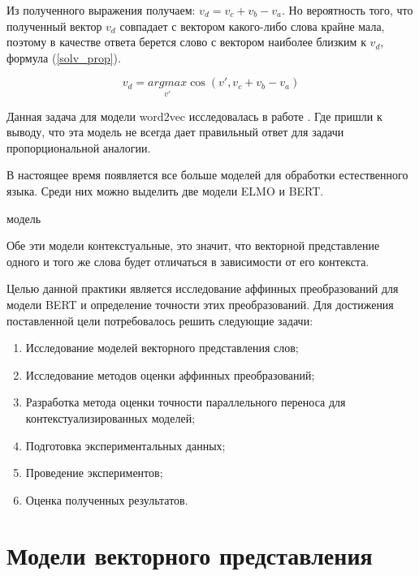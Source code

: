 \documentclass[a4paper,14pt]{article}
\begin{document}
Из полученного выражения получаем: $v_d = v_c + v_b - v_a$.
Но вероятность того, что полученный вектор $v_d$ совпадает с вектором какого-либо слова крайне мала, поэтому в качестве ответа берется слово с вектором наиболее близким к $v_d$, формула (\ref{solv_prop}).

\begin{equation}
	v_d = \underset{v'}{argmax} \cos (v', v_c + v_b - v_a)
	\label{solv_prop}
\end{equation}

Данная задача для модели word2vec исследовалась в работе . Где пришли к выводу, что эта модель не всегда дает правильный ответ для задачи пропорциональной аналогии.

В настоящее время появляется все больше моделей для обработки естественного языка. Среди них можно выделить две модели ELMO и BERT.

модель 

Обе эти модели контекстуальные, это значит, что векторной представление одного и того же слова будет отличаться в зависимости от его контекста.




Целью данной практики является исследование аффинных преобразований для модели BERT и определение точности этих преобразований.
Для достижения поставленной цели потребовалось решить следующие задачи:

\begin{enumerate}
	
\item Исследование моделей векторного представления слов;
 
\item Исследование методов оценки аффинных преобразований;

\item Разработка метода оценки точности параллельного переноса для контекстуализированных моделей;

\item Подготовка экспериментальных данных;

\item Проведение экспериментов;

\item Оценка полученных результатов.


\end{enumerate}

\pagebreak

\section{Модели векторного представления}
\end{document}
